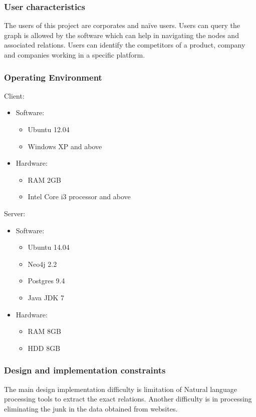 \subsubsection{User characteristics}
\par The users of this project are corporates and naïve users. Users can query the graph is allowed by the software which can help in navigating the nodes and associated relations. Users can identify the competitors of a product, company and companies working in a specific platform.

\subsubsection{Operating Environment}
Client:
\begin{itemize}
\item Software:
\begin{itemize}
\item Ubuntu 12.04
\item Windows XP and above
\end{itemize}
\item Hardware:
\begin{itemize}
\item RAM 2GB
\item Intel Core i3 processor and above
\end{itemize}
\end{itemize}
Server:
\begin{itemize}
\item Software:
\begin{itemize}
\item Ubuntu 14.04
\item Neo4j 2.2
\item Postgres 9.4
\item Java JDK 7
\end{itemize}
\item Hardware:
\begin{itemize}
\item RAM 8GB
\item HDD 8GB
\end{itemize}
\end{itemize}

\subsubsection{Design and implementation constraints}
\par The main design implementation difficulty is limitation of Natural language processing tools to extract the exact relations. Another difficulty is in processing eliminating the junk in the data obtained from websites.
